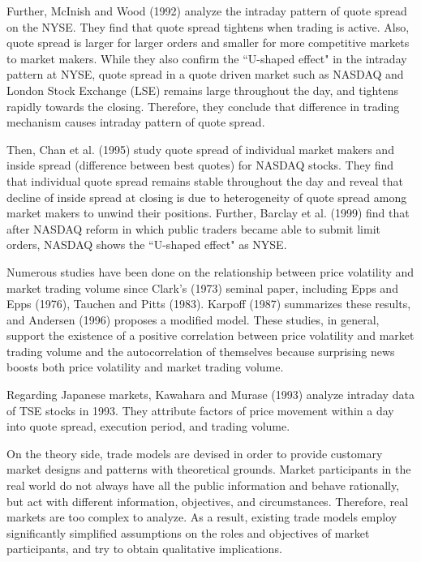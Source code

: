 Further, McInish and Wood (1992) analyze the intraday pattern of quote spread on the NYSE.  They find that quote spread tightens when trading is active.  Also, quote spread is larger for larger orders and smaller for more competitive markets to market makers.  While they also confirm the ``U-shaped effect" in the intraday pattern at NYSE, quote spread in a quote driven market such as NASDAQ and London Stock Exchange (LSE) remains large throughout the day, and tightens rapidly towards the closing.  Therefore, they conclude that difference in trading mechanism causes intraday pattern of quote spread.

Then, Chan et al. (1995) study quote spread of individual market makers and inside spread (difference between best quotes) for NASDAQ stocks.  They find that individual quote spread remains stable throughout the day and reveal that decline of inside spread at closing is due to heterogeneity of quote spread among market makers to unwind their positions.  Further, Barclay et al. (1999) find that after NASDAQ reform in which public traders became able to submit limit orders, NASDAQ shows the ``U-shaped effect" as NYSE.

Numerous studies have been done on the relationship between price volatility and market trading volume since Clark's (1973) seminal paper, including Epps and Epps (1976), Tauchen and Pitts (1983).  Karpoff (1987) summarizes these results, and Andersen (1996) proposes a modified model.  These studies, in general, support the existence of a positive correlation between price volatility and market trading volume and the autocorrelation of themselves because surprising news boosts both price volatility and market trading volume.  

Regarding Japanese markets, Kawahara and Murase (1993) analyze intraday data of TSE stocks in 1993.  They attribute factors of price movement within a day into quote spread, execution period, and trading volume.  

On the theory side,
 trade models are devised in order to provide customary market designs and patterns with theoretical grounds.  Market participants in the real world do not always have all the public information and behave rationally, but act with different information, objectives, and circumstances.  Therefore, real markets are too complex to analyze.  As a result, existing trade models employ significantly simplified assumptions on the roles and objectives of market participants, and try to obtain qualitative implications.  

